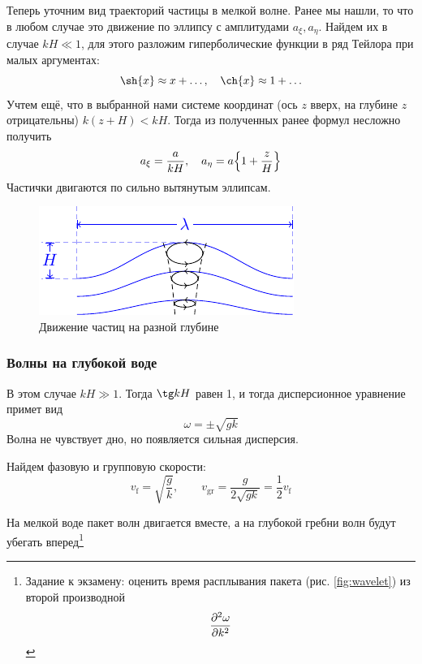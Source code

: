 Теперь уточним вид траекторий частицы в мелкой волне. Ранее мы нашли, то что в любом случае это движение по эллипсу с амплитудами $a_\xi, a_\eta$. Найдем их в случае $kH\ll 1$, для этого разложим гиперболические функции  в ряд Тейлора при малых аргументах:
\begin{equation}
    \sh{x}\approx x+\ldots, \quad \ch{x}\approx 1+\ldots
\end{equation}
Учтем ещё, что в выбранной нами системе координат (ось $z$ вверх, на глубине $z$ отрицательны) $k(z+H)<kH$. Тогда из полученных ранее формул несложно получить
\begin{equation}
    a_\xi = \frac{a}{kH}, \quad
    a_\eta = a\qty{1+\frac{z}{H}}
\end{equation}
Частички двигаются по сильно вытянутым эллипсам.

\begin{figure}[H]
    \centering
    \includegraphics[scale=1.5]{img/ellipse2}
    \caption{Движение частиц на разной глубине}
    \label{fig:ellipse2}
\end{figure}



\subsubsection{Волны на глубокой воде}

В этом случае $kH \gg 1$. Тогда $\tg kH$ равен 1, и тогда дисперсионное уравнение примет вид
\begin{equation}
	\omega=\pm\sqrt{gk}
\end{equation}
Волна не чувствует дно, но появляется сильная дисперсия. 

Найдем фазовую и групповую скорости:
\begin{equation}
	v_\text{f}=\sqrt{\frac{g}{k}}, \qquad v_\text{gr}=\frac{g}{2\sqrt{gk}}=\frac12 v_\text{f}
\end{equation}


На мелкой воде пакет волн двигается вместе, а на глубокой гребни волн будут убегать вперед\footnote{
 Задание к экзамену: оценить время расплывания пакета (рис. \ref{fig:wavelet}) из второй производной
$$
	\pdv[2]{\omega}{k} 	
$$ }


